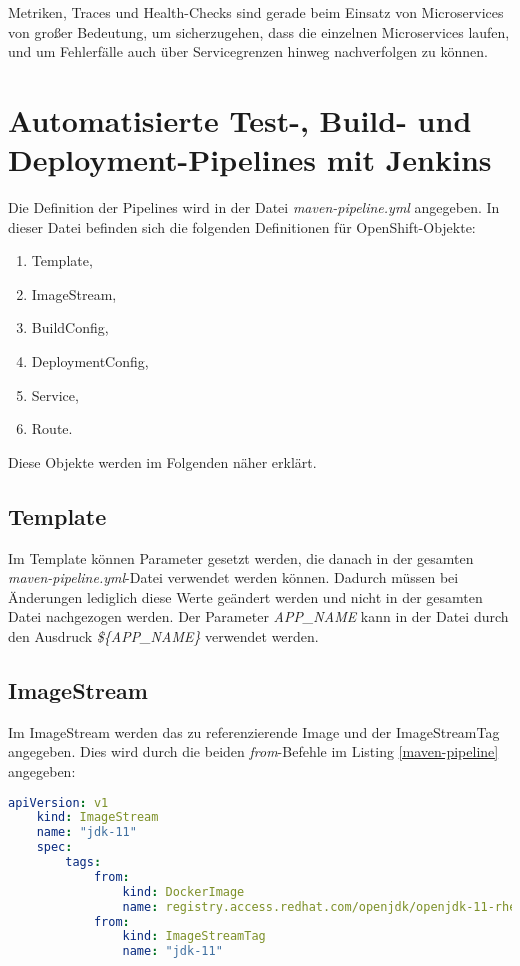 Metriken, Traces und Health-Checks sind gerade beim Einsatz von Microservices von großer Bedeutung, um sicherzugehen, dass die einzelnen Microservices laufen, und um Fehlerfälle auch über Servicegrenzen hinweg nachverfolgen zu können.

\section{Automatisierte Test-, Build- und Deployment-Pipelines mit Jenkins}
Die Definition der Pipelines wird in der Datei \textit{maven-pipeline.yml} angegeben. In dieser Datei befinden sich die folgenden Definitionen für OpenShift-Objekte:
\begin{enumerate}
	\item Template,
	\item ImageStream,
	\item BuildConfig,
	\item DeploymentConfig,
	\item Service,
	\item Route.
\end{enumerate}

Diese Objekte werden im Folgenden näher erklärt.

\subsection{Template}
Im Template können Parameter gesetzt werden, die danach in der gesamten \textit{maven-pipeline.yml}-Datei verwendet werden können. Dadurch müssen bei Änderungen lediglich diese Werte geändert werden und nicht in der gesamten Datei nachgezogen werden. Der Parameter \textit{APP\_NAME} kann in der Datei durch den Ausdruck \textit{\$\{APP\_NAME\}} verwendet werden. 

\subsection{ImageStream}
Im ImageStream werden das zu referenzierende Image und der ImageStreamTag angegeben. Dies wird durch die beiden \textit{from}-Befehle im Listing \ref{maven-pipeline} angegeben:
\begin{lstlisting}[language=yml, caption=maven-pipeline.yml - Template, label=maven-pipeline]
	apiVersion: v1
	kind: ImageStream
	name: "jdk-11"
	spec:
		tags:
			from:
				kind: DockerImage
				name: registry.access.redhat.com/openjdk/openjdk-11-rhel7:latest
			from:
				kind: ImageStreamTag
				name: "jdk-11"
\end{lstlisting}

